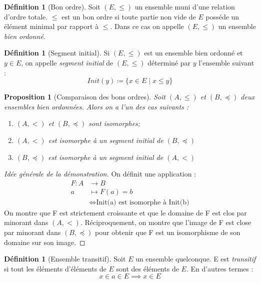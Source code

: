 \documentclass{article}
\theoremstyle{definition}
\newtheorem{definition}[subsubsection]{Définition}
\theoremstyle{plain}
\newtheorem{proposition}[subsubsection]{Proposition}
\theoremstyle{plain}
\theoremstyle{plain}
\theoremstyle{plain}
\theoremstyle{plain}
\begin{document}
\begin{definition}[Bon ordre]
	Soit \( (E,\le) \) un ensemble muni d'une relation d'ordre totale. \( \le \) est un bon ordre si toute partie non vide de \( E \) posséde un élément minimal par rapport à \( \le \). Dans ce cas on appelle \( (E,\le) \) un ensemble \textit{bien ordonné}.	
\end{definition}

\begin{definition}[Segment initial]
	Si \( (E,\le) \) est un ensemble bien ordonné et \( y \in E\), on appelle \textit{segment initial} de \( (E,\le) \) déterminé par \( y \) l'ensemble suivant :
	\begin{equation*}
		Init(y) \coloneqq \{ x \in E \mid x \le y \}
	\end{equation*}
\end{definition}

\begin{proposition}[Comparaison des bons ordres]
	Soit \( (A,\le) \) et \( (B,\preceq) \) deux ensembles bien ordonnées. Alors on a l'un des cas suivants :
	\begin{enumerate}[label = (\roman*)]
		\item \( (A,<) \) et \( (B,\preceq) \) sont isomorphes;
		\item \( (A,<) \) est isomorphe à un segment initial de \( (B,\preceq) \)
		\item \( (B,\preceq) \) est isomorphe à un segment initial de \( (A,<) \)
	\end{enumerate}
\end{proposition}
\begin{proof}[Idée générale de la démonstration]
	On définit une application :
	\begin{align*}
		F : A &\rightarrow B \\
		a &\mapsto F(a) = b \\
			       &\Leftrightarrow \text{Init(a) est isomorphe à Init(b)}
	\end{align*}
	On montre que F est strictement croissante et que le domaine de F est clos par minorant dans \( (A,<) \). Réciproquement, on montre que l'image de F est close par minorant dans \( (B,\preceq) \) pour obtenir que F est un isomorphisme de son domaine sur son image.
\end{proof}
\begin{definition}[Ensemble transitif]
	Soit \( E \) un ensemble quelconque. E est \textit{transitif} si tout les éléments d'éléments de \( E \) sont des éléments de \( E \). En d'autres termes :
	\begin{equation}\label{eq:Tr} \tag{Tr}
		x \in a \in E \implies x \in E 
	\end{equation}
\end{definition}
\end{document}
